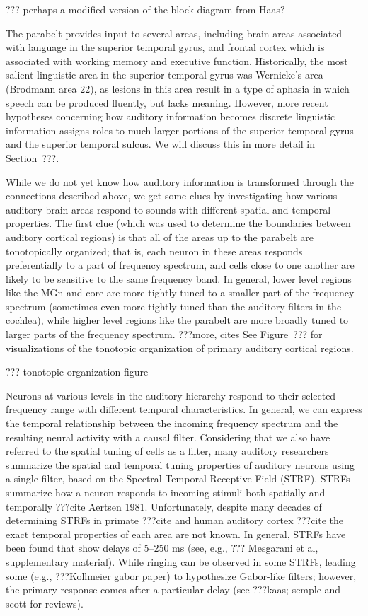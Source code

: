 ??? perhaps a modified version of the block diagram from Haas?

The parabelt provides input
to several areas,
including brain areas
associated with language
in the superior temporal gyrus,
and frontal cortex which is associated
with working memory and executive function.
Historically, the most
salient linguistic area
in the superior temporal gyrus
was Wernicke's area (Brodmann area 22),
as lesions in this area result in
a type of aphasia in which
speech can be produced fluently,
but lacks meaning.
However, more recent hypotheses
concerning how auditory information
becomes discrete linguistic information
assigns roles to much larger portions
of the superior temporal gyrus
and the superior temporal sulcus.
We will discuss this in more detail
in Section~???.

While we do not yet know how auditory information
is transformed through the connections
described above,
we get some clues by investigating
how various auditory brain areas
respond to sounds with different
spatial and temporal properties.
The first clue
(which was used to determine the boundaries
between auditory cortical regions)
is that all of the areas
up to the parabelt are
tonotopically organized;
that is, each neuron in these areas
responds preferentially to
a part of frequency spectrum,
and cells close to one another
are likely to be sensitive
to the same frequency band.
In general, lower level regions
like the MGn and core
are more tightly tuned
to a smaller part of the frequency spectrum
(sometimes even more tightly tuned
than the auditory filters in the cochlea),
while higher level regions
like the parabelt
are more broadly tuned
to larger parts of the frequency spectrum.
???more, cites
See Figure~??? for visualizations
of the tonotopic organization
of primary auditory cortical regions.

??? tonotopic organization figure

Neurons at various levels in the auditory hierarchy
respond to their selected frequency range
with different temporal characteristics.
In general, we can express the temporal
relationship between the incoming
frequency spectrum and the resulting
neural activity with a causal filter.
Considering that we also
have referred to the spatial tuning
of cells as a filter,
many auditory researchers
summarize the spatial and temporal
tuning properties of auditory neurons
using a single filter,
based on the
Spectral-Temporal Receptive Field (STRF).
STRFs summarize how a neuron responds
to incoming stimuli both spatially
and temporally ???cite Aertsen 1981.
Unfortunately, despite many decades
of determining STRFs in
primate ???cite and human auditory cortex ???cite
the exact temporal properties of
each area are not known.
In general, STRFs have been found that
show delays of 5--250 ms
(see, e.g., ??? Mesgarani et al, supplementary material).
While ringing can be observed
in some STRFs, leading some
(e.g., ???Kollmeier gabor paper)
to hypothesize Gabor-like filters;
however, the primary response comes
after a particular delay
(see ???kaas; semple and scott for reviews).

